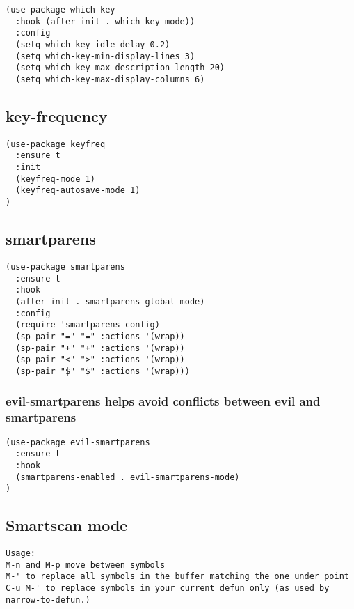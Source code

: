 \documentclass[11pt]{article}
\begin{document}
\begin{verbatim}
(use-package which-key
  :hook (after-init . which-key-mode))
  :config
  (setq which-key-idle-delay 0.2)
  (setq which-key-min-display-lines 3)
  (setq which-key-max-description-length 20)
  (setq which-key-max-display-columns 6)
\end{verbatim}

\subsection*{key-frequency}
\label{sec:org23afdbe}

\begin{verbatim}
(use-package keyfreq
  :ensure t
  :init
  (keyfreq-mode 1)
  (keyfreq-autosave-mode 1)
)
\end{verbatim}

\subsection*{smartparens}
\label{sec:org84784eb}
\begin{verbatim}
(use-package smartparens
  :ensure t
  :hook
  (after-init . smartparens-global-mode)
  :config
  (require 'smartparens-config)
  (sp-pair "=" "=" :actions '(wrap))
  (sp-pair "+" "+" :actions '(wrap))
  (sp-pair "<" ">" :actions '(wrap))
  (sp-pair "$" "$" :actions '(wrap)))
\end{verbatim}

\subsubsection*{evil-smartparens helps avoid conflicts between evil and smartparens}
\label{sec:org3d72e9b}

\begin{verbatim}
(use-package evil-smartparens
  :ensure t
  :hook
  (smartparens-enabled . evil-smartparens-mode)
)
\end{verbatim}

\subsection*{Smartscan mode}
\label{sec:orgd51defa}
\begin{verbatim}
Usage:
M-n and M-p move between symbols
M-' to replace all symbols in the buffer matching the one under point
C-u M-' to replace symbols in your current defun only (as used by narrow-to-defun.)
\end{verbatim}
\end{document}
